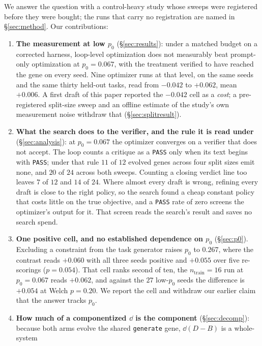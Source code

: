 \documentclass[11pt]{article}
\begin{document}
We answer the question with a control-heavy study whose sweeps were registered before they were
bought; the runs that carry no registration are named in \S\ref{sec:method}. Our
contributions:
\begin{enumerate}
  \item \textbf{The measurement at low $p_0$} (\S\ref{sec:results}): under a matched budget on a
    corrected harness, loop-level optimization does not measurably beat prompt-only optimization
    at $p_0 = 0.067$, with the treatment verified to have reached the gene on every seed. Nine
    optimizer runs at that level, on the same seeds and the same thirty held-out tasks, read from
    $-0.042$ to $+0.062$, mean $+0.006$. A first draft of this paper reported the $-0.042$ cell as
    a \emph{cost}; a pre-registered split-size sweep and an offline estimate of the study's own
    measurement noise withdraw that (\S\ref{sec:splitresult}).
  \item \textbf{What the search does to the verifier, and the rule it is read under}
    (\S\ref{sec:analysis}): at $p_0 = 0.067$ the optimizer converges on a verifier that does not
    accept. The loop counts a critique as a \texttt{PASS} only when its text begins with
    \texttt{PASS}; under that rule $11$ of $12$ evolved genes across four split sizes emit none,
    and $20$ of $24$ across both sweeps. Counting a closing verdict line too leaves $7$ of $12$ and
    $14$ of $24$. Where almost every draft is wrong, refining every draft is close to the right
    policy, so the search found a cheap constant policy that costs little on the true objective,
    and a \texttt{PASS} rate of zero screens the optimizer's output for it. That screen reads the
    search's result and saves no search spend.
  \item \textbf{One positive cell, and no established dependence on $p_0$} (\S\ref{sec:p0}).
    Excluding a constraint from the task generator raises $p_0$ to $0.267$, where the contrast
    reads $+0.060$ with all three seeds positive and $+0.055$ over five re-scorings ($p = 0.054$).
    That cell ranks second of ten, the $n_{\mathrm{train}} = 16$ run at $p_0 = 0.067$ reads
    $+0.062$, and against the $27$ low-$p_0$ seeds the difference is $+0.054$ at Welch
    $p = 0.20$. We report the cell and withdraw our earlier claim that the answer tracks $p_0$.
  \item \textbf{How much of a componentized $\dd$ is the component} (\S\ref{sec:decomp}):
    because both arms evolve the shared \texttt{generate} gene, $\dd(D-B)$ is a whole-system

\end{enumerate}
\end{document}
